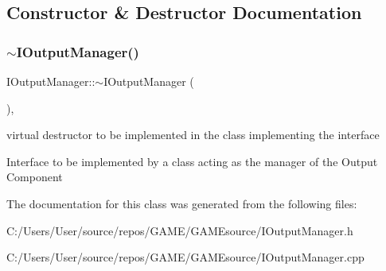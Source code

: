 \subsection{Constructor \& Destructor Documentation}
\mbox{\label{class_i_output_manager_a7442c5161bf453dc13605f7aaeeea2b5}} 
\subsubsection{\texorpdfstring{$\sim$\+I\+Output\+Manager()}{~IOutputManager()}}
{\footnotesize\ttfamily I\+Output\+Manager\+::$\sim$\+I\+Output\+Manager (\begin{DoxyParamCaption}{ }\end{DoxyParamCaption})\hspace{0.3cm}{\ttfamily [pure virtual]}, {\ttfamily [default]}}



virtual destructor to be implemented in the class implementing the interface 

Interface to be implemented by a class acting as the manager of the Output Component 

The documentation for this class was generated from the following files\+:\begin{DoxyCompactItemize}
\item 
C\+:/\+Users/\+User/source/repos/\+G\+A\+M\+E/\+G\+A\+M\+Esource/I\+Output\+Manager.\+h\item 
C\+:/\+Users/\+User/source/repos/\+G\+A\+M\+E/\+G\+A\+M\+Esource/I\+Output\+Manager.\+cpp\end{DoxyCompactItemize}
